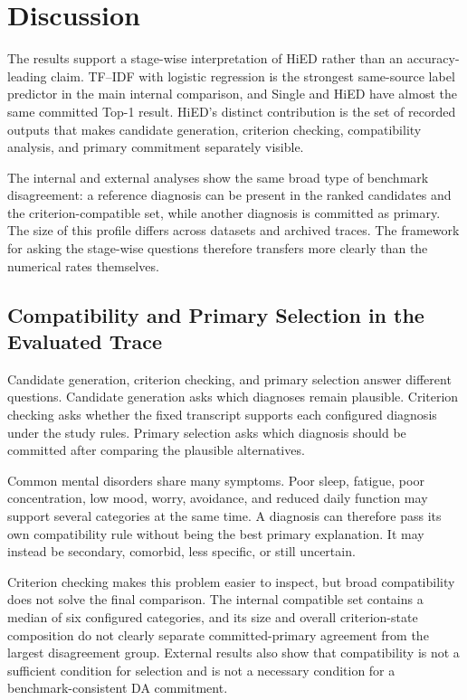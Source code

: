 \chapter{Discussion}
\label{ch:discussion}

The results support a stage-wise interpretation of HiED rather than an accuracy-leading claim. TF--IDF with logistic regression is the strongest same-source label predictor in the main internal comparison, and Single and HiED have almost the same committed Top-1 result. HiED's distinct contribution is the set of recorded outputs that makes candidate generation, criterion checking, compatibility analysis, and primary commitment separately visible.

The internal and external analyses show the same broad type of benchmark disagreement: a reference diagnosis can be present in the ranked candidates and the criterion-compatible set, while another diagnosis is committed as primary. The size of this profile differs across datasets and archived traces. The framework for asking the stage-wise questions therefore transfers more clearly than the numerical rates themselves.

\section{Compatibility and Primary Selection in the Evaluated Trace}
\label{sec:discussion-primary-selection}

Candidate generation, criterion checking, and primary selection answer different questions. Candidate generation asks which diagnoses remain plausible. Criterion checking asks whether the fixed transcript supports each configured diagnosis under the study rules. Primary selection asks which diagnosis should be committed after comparing the plausible alternatives.

Common mental disorders share many symptoms. Poor sleep, fatigue, poor concentration, low mood, worry, avoidance, and reduced daily function may support several categories at the same time. A diagnosis can therefore pass its own compatibility rule without being the best primary explanation. It may instead be secondary, comorbid, less specific, or still uncertain.

Criterion checking makes this problem easier to inspect, but broad compatibility does not solve the final comparison. The internal compatible set contains a median of six configured categories, and its size and overall criterion-state composition do not clearly separate committed-primary agreement from the largest disagreement group. External results also show that compatibility is not a sufficient condition for selection and is not a necessary condition for a benchmark-consistent DA commitment.

